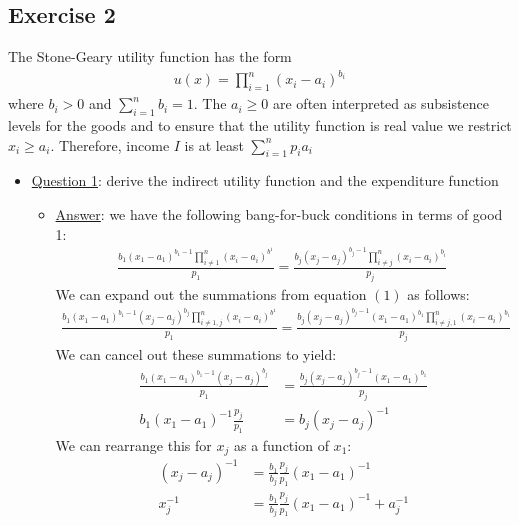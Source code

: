 \documentclass{article}
\begin{document}
\subsection{Exercise 2}
The Stone-Geary utility function has the form
\begin{gather*}
  u(x) = \prod_{i=1}^{n}(x_{i} - a_{i})^{b_{i}}
\end{gather*}
where $b_{i} > 0$ and $\sum_{i=1}^{n}b_{i} = 1$. The $a_{i} \geq 0$ are often interpreted as subsistence levels for the goods and to ensure that the utility function is real value we restrict $x_{i} \geq a_{i}$. Therefore, income $I$ is at least $\sum_{i=1}^{n} p_{i}a_{i}$ \par \vspace{0.3em}
\begin{itemize}
  \item  \underline{Question 1}: derive the indirect utility function and the expenditure function
  \begin{itemize}
    \item  \underline{Answer}: we have the following bang-for-buck conditions in terms of good 1:
    \begin{gather*}
      \frac{b_{1}(x_{1}-a_{1})^{b_{1}-1}\prod_{i \neq 1}^{n}(x_{i} - a_{i})^{b^{1}}}{p_{1}} = \frac{b_{j}(x_{j} - a_{j})^{b_{j}-1} \prod_{i \neq j}^{n}(x_{i} - a_{i})^{b_{i}}}{p_{j}} \ \tag{1}
    \end{gather*}
    We can expand out the summations from equation $(1)$ as follows:
    \begin{gather*}
      \frac{b_{1}(x_{1}-a_{1})^{b_{1}-1} (x_{j} - a_{j})^{b_{j}} \prod_{i \neq 1,j}^{n}(x_{i} - a_{i})^{b^{1}}}{p_{1}} = \frac{b_{j}(x_{j} - a_{j})^{b_{j}-1} (x_{1} - a_{1})^{b_{1}} \prod_{i \neq j,1}^{n}(x_{i} - a_{i})^{b_{i}}}{p_{j}}
    \end{gather*}
    We can cancel out these summations to yield:
    \begin{align*}
      \frac{b_{1}(x_{1}-a_{1})^{b_{1}-1} (x_{j} - a_{j})^{b_{j}}}{p_{1}} &= \frac{b_{j}(x_{j} - a_{j})^{b_{j}-1} (x_{1} - a_{1})^{b_{1}}}{p_{j}} \\
      b_{1}(x_{1} - a_{1})^{-1} \frac{p_{j}}{p_{1}} &= b_{j}(x_{j} - a_{j})^{-1}
    \end{align*}
    We can rearrange this for $x_{j}$ as a function of $x_{1}$:
    \begin{align*}
      (x_{j} - a_{j})^{-1} &= \frac{b_{1}}{b_{j}} \frac{p_{j}}{p_{1}} (x_{1} - a_{1})^{-1} \\
      x_{j}^{-1} &= \frac{b_{1}}{b_{j}} \frac{p_{j}}{p_{1}} (x_{1} - a_{1})^{-1} + a_{j}^{-1} \\

\end{align*}
\end{itemize}
\end{itemize}
\end{document}
